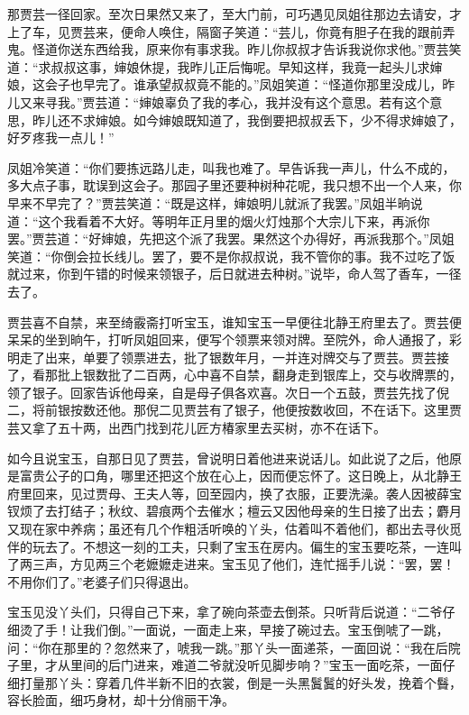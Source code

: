 \documentclass[12pt,oneside]{book}
\begin{document}
那贾芸一径回家。至次日果然又来了，至大门前，可巧遇见凤姐往那边去请安，才上了车，见贾芸来，便命人唤住，隔窗子笑道：“芸儿，你竟有胆子在我的跟前弄鬼。怪道你送东西给我，原来你有事求我。昨儿你叔叔才告诉我说你求他。”贾芸笑道：“求叔叔这事，婶娘休提，我昨儿正后悔呢。早知这样，我竟一起头儿求婶娘，这会子也早完了。谁承望叔叔竟不能的。”凤姐笑道：“怪道你那里没成儿，昨儿又来寻我。”贾芸道：“婶娘辜负了我的孝心，我并没有这个意思。若有这个意思，昨儿还不求婶娘。如今婶娘既知道了，我倒要把叔叔丢下，少不得求婶娘了，好歹疼我一点儿！”

凤姐冷笑道：“你们要拣远路儿走，叫我也难了。早告诉我一声儿，什么不成的，多大点子事，耽误到这会子。那园子里还要种树种花呢，我只想不出一个人来，你早来不早完了？”贾芸笑道：“既是这样，婶娘明儿就派了我罢。”凤姐半晌说道：“这个我看着不大好。等明年正月里的烟火灯烛那个大宗儿下来，再派你罢。”贾芸道：“好婶娘，先把这个派了我罢。果然这个办得好，再派我那个。”凤姐笑道：“你倒会拉长线儿。罢了，要不是你叔叔说，我不管你的事。我不过吃了饭就过来，你到午错的时候来领银子，后日就进去种树。”说毕，命人驾了香车，一径去了。

贾芸喜不自禁，来至绮霰斋打听宝玉，谁知宝玉一早便往北静王府里去了。贾芸便呆呆的坐到晌午，打听凤姐回来，便写个领票来领对牌。至院外，命人通报了，彩明走了出来，单要了领票进去，批了银数年月，一并连对牌交与了贾芸。贾芸接了，看那批上银数批了二百两，心中喜不自禁，翻身走到银库上，交与收牌票的，领了银子。回家告诉他母亲，自是母子俱各欢喜。次日一个五鼓，贾芸先找了倪二，将前银按数还他。那倪二见贾芸有了银子，他便按数收回，不在话下。这里贾芸又拿了五十两，出西门找到花儿匠方椿家里去买树，亦不在话下。

如今且说宝玉，自那日见了贾芸，曾说明日着他进来说话儿。如此说了之后，他原是富贵公子的口角，哪里还把这个放在心上，因而便忘怀了。这日晚上，从北静王府里回来，见过贾母、王夫人等，回至园内，换了衣服，正要洗澡。袭人因被薛宝钗烦了去打结子；秋纹、碧痕两个去催水；檀云又因他母亲的生日接了出去；麝月又现在家中养病；虽还有几个作粗活听唤的丫头，估着叫不着他们，都出去寻伙觅伴的玩去了。不想这一刻的工夫，只剩了宝玉在房内。偏生的宝玉要吃茶，一连叫了两三声，方见两三个老嬷嬷走进来。宝玉见了他们，连忙摇手儿说：“罢，罢！不用你们了。”老婆子们只得退出。

宝玉见没丫头们，只得自己下来，拿了碗向茶壶去倒茶。只听背后说道：“二爷仔细烫了手！让我们倒。”一面说，一面走上来，早接了碗过去。宝玉倒唬了一跳，问：“你在那里的？忽然来了，唬我一跳。”那丫头一面递茶，一面回说：“我在后院子里，才从里间的后门进来，难道二爷就没听见脚步响？”宝玉一面吃茶，一面仔细打量那丫头：穿着几件半新不旧的衣裳，倒是一头黑鬒鬒的好头发，挽着个䰖，容长脸面，细巧身材，却十分俏丽干净。
\end{document}
